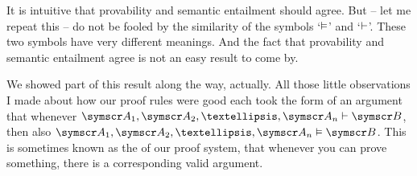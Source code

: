 It is intuitive that provability and semantic entailment should agree. But – let me repeat this – do not be fooled by the similarity of the symbols `$\vDash$' and `$\vdash$'. These two symbols have very different meanings. And the fact that provability and semantic entailment agree is not an easy result to come by. 

We showed part of this result along the way, actually. All those little observations I made about how our proof rules were good each took the form of an argument that whenever $\meta{A}_{1}, \meta{A}_{2}, …, \meta{A}_{n} \proves\meta{B}$, then also $\meta{A}_{1}, \meta{A}_{2}, …, \meta{A}_{n} \entails\meta{B}$. This is sometimes known as the  of our proof system, that whenever you can prove something, there is a corresponding valid argument.







